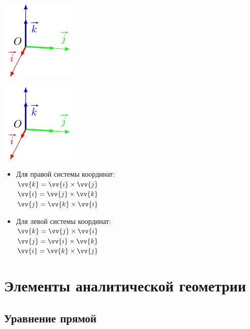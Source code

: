 \documentclass[10pt]{beamer}
\begin{document}
{
	{
		\includegraphics[page=1]{vecprort.pdf}
		
		\includegraphics[page=2]{vecprort.pdf}
	}
	{
		\begin{itemize}
			\item {Для правой системы координат: \\
			$\vv{k}=\vv{i}\times\vv{j}$ \\
			$\vv{i}=\vv{j}\times\vv{k}$ \\
			$\vv{j}=\vv{k}\times\vv{i}$}
			\item {Для левой системы координат: \\
			$\vv{k}=\vv{j}\times\vv{i}$\\
			$\vv{j}=\vv{i}\times\vv{k}$\\
			$\vv{i}=\vv{k}\times\vv{j}$\\}
		\end{itemize}
	}
}

\section {Элементы аналитической геометрии}

\frame{\sectionpage}

\subsection{Уравнение прямой}
\end{document}
